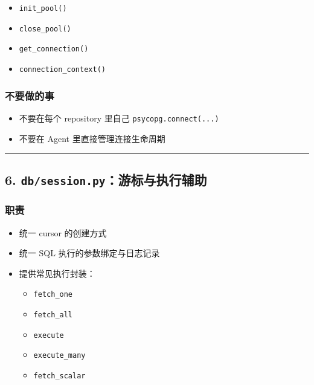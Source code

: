 \documentclass[UTF8]{ctexart}
\providecommand{\tightlist}{%
  \setlength{\itemsep}{0pt}\setlength{\parskip}{0pt}}
\begin{document}
\begin{itemize}
\tightlist
\item
  \texttt{init\_pool()}
\item
  \texttt{close\_pool()}
\item
  \texttt{get\_connection()}
\item
  \texttt{connection\_context()}
\end{itemize}

\hypertarget{ux4e0dux8981ux505aux7684ux4e8b}{%
\subsubsection{不要做的事}\label{ux4e0dux8981ux505aux7684ux4e8b}}

\begin{itemize}
\tightlist
\item
  不要在每个 repository 里自己 \texttt{psycopg.connect(...)}
\item
  不要在 Agent 里直接管理连接生命周期
\end{itemize}

\begin{center}\rule{0.5\linewidth}{0.5pt}\end{center}

\hypertarget{dbsession.pyux6e38ux6807ux4e0eux6267ux884cux8f85ux52a9}{%
\subsection{\texorpdfstring{6.
\texttt{db/session.py}：游标与执行辅助}{6. db/session.py：游标与执行辅助}}\label{dbsession.pyux6e38ux6807ux4e0eux6267ux884cux8f85ux52a9}}

\hypertarget{ux804cux8d23-1}{%
\subsubsection{职责}\label{ux804cux8d23-1}}

\begin{itemize}
\tightlist
\item
  统一 cursor 的创建方式
\item
  统一 SQL 执行的参数绑定与日志记录
\item
  提供常见执行封装：

  \begin{itemize}
  \tightlist
  \item
    \texttt{fetch\_one}
  \item
    \texttt{fetch\_all}
  \item
    \texttt{execute}
  \item
    \texttt{execute\_many}
  \item
    \texttt{fetch\_scalar}
  \end{itemize}
\end{itemize}
\end{document}
